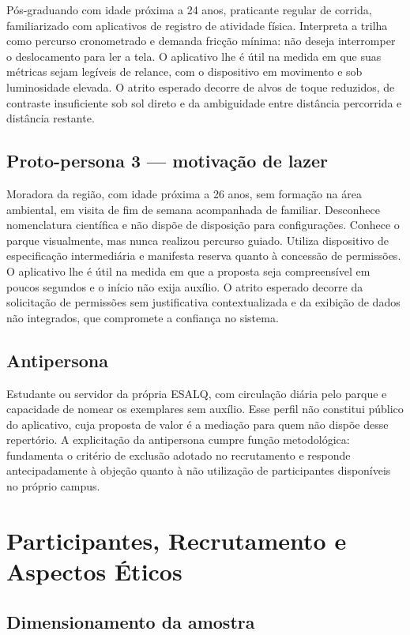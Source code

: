Pós-graduando com idade próxima a 24 anos, praticante regular de corrida,
familiarizado com aplicativos de registro de atividade física. Interpreta a trilha
como percurso cronometrado e demanda fricção mínima: não deseja interromper o
deslocamento para ler a tela. O aplicativo lhe é útil na medida em que suas
métricas sejam legíveis de relance, com o dispositivo em movimento e sob
luminosidade elevada. O atrito esperado decorre de alvos de toque reduzidos, de
contraste insuficiente sob sol direto e da ambiguidade entre distância percorrida
e distância restante.

\subsection{Proto-persona 3 --- motivação de lazer}

Moradora da região, com idade próxima a 26 anos, sem formação na área ambiental,
em visita de fim de semana acompanhada de familiar. Desconhece nomenclatura
científica e não dispõe de disposição para configurações. Conhece o parque
visualmente, mas nunca realizou percurso guiado. Utiliza dispositivo de
especificação intermediária e manifesta reserva quanto à concessão de permissões.
O aplicativo lhe é útil na medida em que a proposta seja compreensível em poucos
segundos e o início não exija auxílio. O atrito esperado decorre da solicitação de
permissões sem justificativa contextualizada e da exibição de dados não
integrados, que compromete a confiança no sistema.

\subsection{Antipersona}

Estudante ou servidor da própria ESALQ, com circulação diária pelo parque e
capacidade de nomear os exemplares sem auxílio. Esse perfil não constitui público
do aplicativo, cuja proposta de valor é a mediação para quem não dispõe desse
repertório. A explicitação da antipersona cumpre função metodológica: fundamenta o
critério de exclusão adotado no recrutamento e responde antecipadamente à
objeção quanto à não utilização de participantes disponíveis no próprio campus.

\section{Participantes, Recrutamento e Aspectos Éticos}
\label{sec:participantes}

\subsection{Dimensionamento da amostra}

